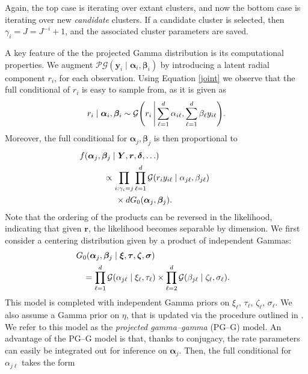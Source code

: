 Again, the top case is iterating over extant clusters, and now the bottom case is iterating 
    over new \emph{candidate} clusters.  If a candidate cluster is selected,
    then $\gamma_i = J = J^{- i} + 1$, and the associated cluster parameters are saved.

A key feature of the the projected Gamma distribution is its computational properties. We augment 
$\mathcal{PG}(\bm{y}_i\mid\bm{\alpha}_i,\bm{\beta}_i) $ by introducing a latent radial component $r_i$, 
for each observation. Using Equation \eqref{joint} we observe that the 
full conditional of $r_i$ is easy to sample from, as it is given as
\begin{equation}
    r_i\mid\bm{\alpha}_i,\bm{\beta}_i \sim \mathcal{G}\left(r_i \bigmid \sum_{\ell = 1}^d\alpha_{i\ell}, \sum_{\ell = 1}^d\beta_{\ell} y_{i\ell}\right).
\end{equation}
Moreover,  the full conditional for $\bm{\alpha}_j,\bm{\beta}_j$ is then proportional to
\begin{equation}
    \begin{aligned}
    &\hspace{-1cm}f(\bm{\alpha}_j,\bm{\beta}_j\mid \bm{Y},\bm{r},\bm{\delta},\ldots) \\
    &\propto \prod_{i:\gamma_i = j}\prod_{\ell = 1}^d\mathcal{G}\left(r_iy_{i\ell}\mid\alpha_{j\ell},\beta_{j\ell}\right) \\
    &\hspace{0.5cm} \times dG_0(\bm{\alpha}_j,\bm{\beta}_j).
    \end{aligned}
\end{equation}
Note that the ordering of the products can be reversed in the likelihood, indicating that given $\bm{r}$, 
the likelihood becomes separable by dimension.
We first consider a centering distribution given by a product of independent Gammas:
\begin{equation}
    \begin{aligned}
    &\hspace{-0.3cm}G_0(\bm{\alpha}_j,\bm{\beta}_j\mid \bm{\xi},\bm{\tau},\bm{\zeta},\bm{\sigma}) \\
    &= \prod_{\ell = 1}^d\mathcal{G}(\alpha_{j\ell}\mid \xi_{\ell},\tau_{\ell})\times\prod_{\ell = 2}^d\mathcal{G}(\beta_{j\ell}\mid\zeta_{\ell},\sigma_{\ell}).
    \end{aligned}
\end{equation}
This model is completed with independent Gamma priors on $\xi_{\ell}$, $\tau_{\ell}$, $\zeta_{\ell}$, $\sigma_{\ell}$.  We also assume a Gamma prior on $\eta$, that is updated via the procedure outlined in \cite{escobar1995}.  We refer to this model as the \emph{projected gamma--gamma} (PG--G) model.  An advantage of the PG--G model is that, thanks to conjugacy, the rate parameters can easily be integrated out for inference on $\bm{\alpha}_j$.  Then, the full conditional for $\alpha_{j\ell}$ takes the form
